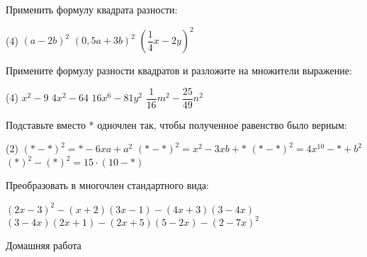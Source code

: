 \begin{class}[number=1]
\begin{listofex}
		\item Применить формулу квадрата разности:
		\begin{tasks}(4)
			\task \( (a-2b)^2 \)
			\task \( (0,5a+3b)^2 \)
			\task \( \left( \dfrac{1}{4}x-2y \right)^2 \)
		\end{tasks}
		\item Примените формулу разности квадратов и разложите на множители выражение:
		\begin{tasks}(4)
			\task \( x^2-9 \)
			\task \( 4x^2-64 \)
			\task \( 16x^6-81y^2 \)
			\task \( \dfrac{1}{16}m^2-\dfrac{25}{49}n^2 \)
		\end{tasks}
		\item Подставьте вместо * одночлен так, чтобы полученное равенство было верным:
		\begin{tasks}(2)
			\task \( (*-*)^2=*-6xa+a^2 \)
			\task \( (*-*)^2=x^2-3xb+* \)
			\task \( (*-*)^2=4x^{10}-*+b^2 \)
			\task \( (*)^2-(*)^2= 15 \cdot (10-*) \)
		\end{tasks}
		\item Преобразовать в многочлен стандартного вида:
		\begin{itasks}[1]
			\task \( (2x-3)^2-(x+2)(3x-1)-(4x+3)(3-4x) \)
			\task \( (3-4x)(2x+1)-(2x+5)(5-2x)-(2-7x)^2 \)
		\end{itasks}
	\end{listofex}
\end{class}

\begin{homework}[number=1]
		\begin{listofex}
			\item Домашняя работа
		\end{listofex}
\end{homework}

